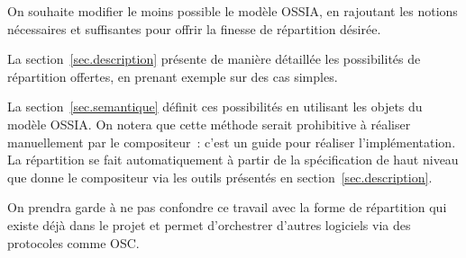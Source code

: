 \documentclass{article}
\newcommand\ossia{OSSIA\xspace}
\begin{document}
On souhaite modifier le moins possible le modèle \ossia, 
en rajoutant les notions nécessaires et suffisantes pour offrir la finesse de répartition désirée.

La section~\ref{sec.description} présente de manière détaillée les possibilités 
de répartition offertes, en prenant exemple sur des cas simples.

La section~\ref{sec.semantique} définit ces possibilités en utilisant les objets du modèle \ossia. 
On notera que cette méthode serait prohibitive à réaliser manuellement par le compositeur~: c'est un guide pour réaliser l'implémentation. 
La répartition se fait automatiquement à partir de la spécification de haut niveau que donne le compositeur via les outils présentés en section~\ref{sec.description}. 

On prendra garde à ne pas confondre ce travail avec la forme de répartition qui existe déjà dans le projet et permet d'orchestrer d'autres logiciels via des protocoles comme OSC.








\end{document}

